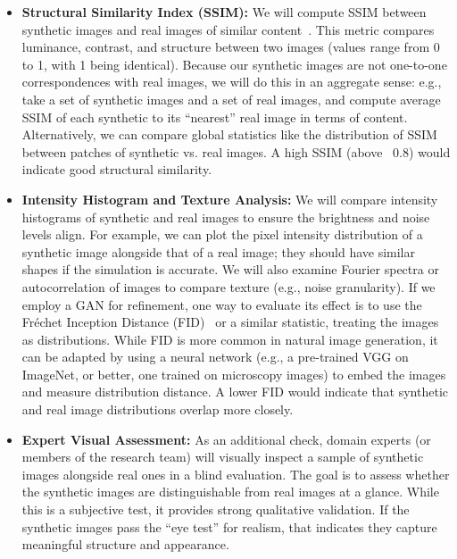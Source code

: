 \documentclass[
oneside,      %
openany       %
]{imc-inf}
\begin{document}
	
	\begin{itemize}
		\item \textbf{Structural Similarity Index (SSIM):} We will compute SSIM between synthetic images and real images of similar content~\cite{wang2004image}. This metric compares luminance, contrast, and structure between two images (values range from 0 to 1, with 1 being identical). Because our synthetic images are not one-to-one correspondences with real images, we will do this in an aggregate sense: e.g., take a set of synthetic images and a set of real images, and compute average SSIM of each synthetic to its “nearest” real image in terms of content. Alternatively, we can compare global statistics like the distribution of SSIM between patches of synthetic vs. real images. A high SSIM (above ~0.8) would indicate good structural similarity.
		
		\item \textbf{Intensity Histogram and Texture Analysis:} We will compare intensity histograms of synthetic and real images to ensure the brightness and noise levels align. For example, we can plot the pixel intensity distribution of a synthetic image alongside that of a real image; they should have similar shapes if the simulation is accurate. We will also examine Fourier spectra or autocorrelation of images to compare texture (e.g., noise granularity). If we employ a GAN for refinement, one way to evaluate its effect is to use the Fréchet Inception Distance (FID)~\cite{heusel2017gans} or a similar statistic, treating the images as distributions. While FID is more common in natural image generation, it can be adapted by using a neural network (e.g., a pre-trained VGG on ImageNet, or better, one trained on microscopy images) to embed the images and measure distribution distance. A lower FID would indicate that synthetic and real image distributions overlap more closely.
		
		\item \textbf{Expert Visual Assessment:} As an additional check, domain experts (or members of the research team) will visually inspect a sample of synthetic images alongside real ones in a blind evaluation. The goal is to assess whether the synthetic images are distinguishable from real images at a glance. While this is a subjective test, it provides strong qualitative validation. If the synthetic images pass the “eye test” for realism, that indicates they capture meaningful structure and appearance.
		
	\end{itemize}
	
\end{document}
